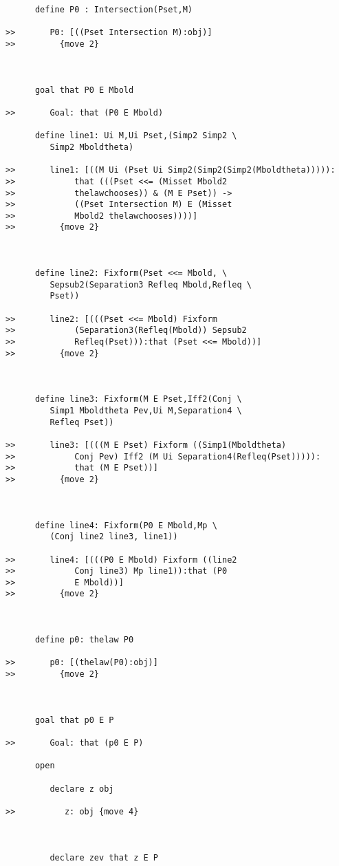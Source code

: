 \documentclass[12pt]{article}
\begin{document}
\begin{verbatim}
      define P0 : Intersection(Pset,M)

>>       P0: [((Pset Intersection M):obj)]
>>         {move 2}



      goal that P0 E Mbold

>>       Goal: that (P0 E Mbold)

      define line1: Ui M,Ui Pset,(Simp2 Simp2 \
         Simp2 Mboldtheta)

>>       line1: [((M Ui (Pset Ui Simp2(Simp2(Simp2(Mboldtheta))))):
>>            that (((Pset <<= (Misset Mbold2
>>            thelawchooses)) & (M E Pset)) ->
>>            ((Pset Intersection M) E (Misset
>>            Mbold2 thelawchooses))))]
>>         {move 2}



      define line2: Fixform(Pset <<= Mbold, \
         Sepsub2(Separation3 Refleq Mbold,Refleq \
         Pset))

>>       line2: [(((Pset <<= Mbold) Fixform
>>            (Separation3(Refleq(Mbold)) Sepsub2
>>            Refleq(Pset))):that (Pset <<= Mbold))]
>>         {move 2}



      define line3: Fixform(M E Pset,Iff2(Conj \
         Simp1 Mboldtheta Pev,Ui M,Separation4 \
         Refleq Pset))

>>       line3: [(((M E Pset) Fixform ((Simp1(Mboldtheta)
>>            Conj Pev) Iff2 (M Ui Separation4(Refleq(Pset))))):
>>            that (M E Pset))]
>>         {move 2}



      define line4: Fixform(P0 E Mbold,Mp \
         (Conj line2 line3, line1))

>>       line4: [(((P0 E Mbold) Fixform ((line2
>>            Conj line3) Mp line1)):that (P0
>>            E Mbold))]
>>         {move 2}



      define p0: thelaw P0

>>       p0: [(thelaw(P0):obj)]
>>         {move 2}



      goal that p0 E P

>>       Goal: that (p0 E P)

      open

         declare z obj

>>          z: obj {move 4}



         declare zev that z E P


\end{verbatim}
\end{document}
